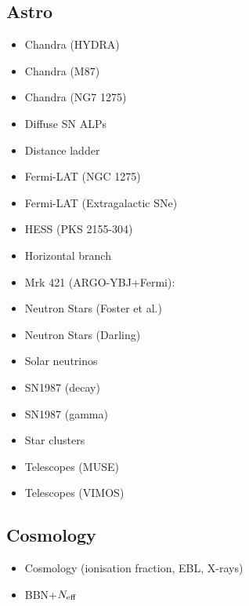 \documentclass[10pt,twocolumn]{article}
\begin{document}
\subsection*{Astro}
\begin{itemize}\setlength\itemsep{-0.5em}
    \item Chandra (HYDRA)~\cite{Wouters:2013hua}
    \item Chandra (M87)~\cite{Marsh:2017yvc}
    \item Chandra (NG7 1275)~\cite{Reynolds:2019uqt}
    \item Diffuse SN ALPs~\cite{Calore:2020tjw}
    \item Distance ladder~\cite{Buen-Abad:2020zbd}
    \item Fermi-LAT (NGC 1275)~\cite{Fermi-LAT:2016nkz}
    \item Fermi-LAT (Extragalactic SNe)~\cite{Meyer:2020vzy}
    \item HESS (PKS 2155-304)~\cite{HESS:2013udx}
    \item Horizontal branch~\cite{Ayala:2014pea}
    \item Mrk 421 (ARGO-YBJ+Fermi):~\cite{Li:2020pcn}
    \item Neutron Stars (Foster et al.)~\cite{Foster:2020pgt}
    \item Neutron Stars (Darling)~\cite{Darling:2020uyo}
    \item Solar neutrinos~\cite{Vinyoles2015}
    \item SN1987 (decay)~\cite{Jaeckel:2017tud}
    \item SN1987 (gamma)~\cite{Payez:2014xsa}
    \item Star clusters~\cite{Dessert:2020lil}
    \item Telescopes (MUSE)~\cite{Regis:2020fhw}
    \item Telescopes (VIMOS)~\cite{Grin:2006aw}
\end{itemize}
\vspace{-2em}
\subsection*{Cosmology}
\begin{itemize}\setlength\itemsep{-0.5em}
    \item Cosmology (ionisation fraction, EBL, X-rays)~\cite{Cadamuro:2011fd}
    \item BBN+$N_{\rm eff}$~\cite{Depta:2020wmr}
\end{itemize}
\end{document}
